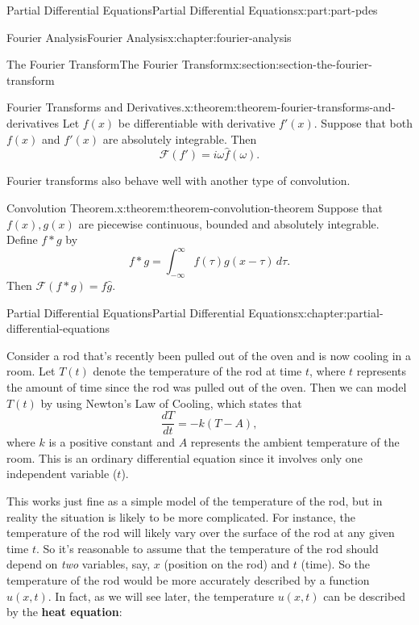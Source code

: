 \documentclass[twoside,10pt,]{book}
\newcommand{\terminology}[1]{\textbf{#1}}
\numberwithin{equation}{part}
\begin{document}
\begin{partptx}{Partial Differential Equations}{}{Partial Differential Equations}{}{}{x:part:part-pdes}
\begin{chapterptx}{Fourier Analysis}{}{Fourier Analysis}{}{}{x:chapter:fourier-analysis}
\begin{sectionptx}{The Fourier Transform}{}{The Fourier Transform}{}{}{x:section:section-the-fourier-transform}
\begin{theorem}{Fourier Transforms and Derivatives.}{}{x:theorem:theorem-fourier-transforms-and-derivatives}
%
Let \(f(x)\) be differentiable with derivative \(f'(x)\). Suppose that both \(f(x)\) and \(f'(x)\) are absolutely integrable. Then%
\begin{equation*}
\mathcal{F}(f') = i\omega\hat{f}(\omega).
\end{equation*}
%
\end{theorem}
Fourier transforms also behave well with another type of convolution.%
\begin{theorem}{Convolution Theorem.}{}{x:theorem:theorem-convolution-theorem}%
%
Suppose that \(f(x),g(x)\) are piecewise continuous, bounded and absolutely integrable. Define \(f\ast g\) by%
\begin{equation*}
f\ast g = \int_{-\infty}^{\infty}f(\tau)g(x-\tau)\,d\tau.
\end{equation*}
Then \(\mathcal{F}(f\ast g) = \hat{f}\hat{g}.\)%
\end{theorem}
\end{sectionptx}
\end{chapterptx}
%
\typeout{************************************************}
\typeout{************************************************}
%
\begin{chapterptx}{Partial Differential Equations}{}{Partial Differential Equations}{}{}{x:chapter:partial-differential-equations}
\begin{introduction}{}%
Consider a rod that's recently been pulled out of the oven and is now cooling in a room. Let \(T(t)\) denote the temperature of the rod at time \(t\), where \(t\) represents the amount of time since the rod was pulled out of the oven. Then we can model \(T(t)\) by using Newton's Law of Cooling, which states that%
\begin{equation*}
\frac{dT}{dt} = -k(T-A),
\end{equation*}
where \(k\) is a positive constant and \(A\) represents the ambient temperature of the room. This is an ordinary differential equation since it involves only one independent variable (\(t\)).%
\par
This works just fine as a simple model of the temperature of the rod, but in reality the situation is likely to be more complicated. For instance, the temperature of the rod will likely vary over the surface of the rod at any given time \(t\). So it's reasonable to assume that the temperature of the rod should depend on \emph{two} variables, say, \(x\) (position on the rod) and \(t\) (time). So the temperature of the rod would be more accurately described by a function \(u(x,t)\). In fact, as we will see later, the temperature \(u(x,t)\) can be described by the \terminology{heat equation}:%

\end{introduction}
\end{chapterptx}
\end{partptx}
\end{document}
